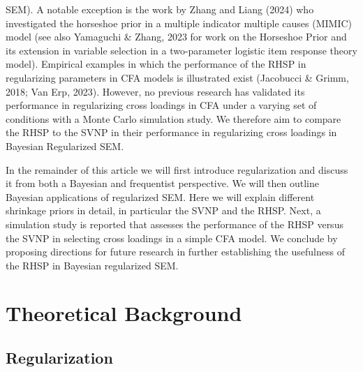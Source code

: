 \documentclass[
  man, donotrepeattitle,floatsintext]{apa6}
\begin{document}
SEM). A notable exception is the work by Zhang and Liang (2024) who
investigated the horseshoe prior in a multiple indicator multiple causes
(MIMIC) model (see also Yamaguchi \& Zhang, 2023 for work on the Horseshoe
Prior and its extension in variable selection in a two-parameter
logistic item response theory model). Empirical examples in which the
performance of the RHSP in regularizing parameters in CFA models is
illustrated exist (Jacobucci \& Grimm, 2018; Van Erp, 2023). However,
no previous research has validated its performance in regularizing cross
loadings in CFA under a varying set of conditions with a Monte Carlo
simulation study. We therefore aim to compare the RHSP to the SVNP in
their performance in regularizing cross loadings in Bayesian Regularized
SEM.

In the remainder of this article we will first introduce regularization and
discuss it from both a Bayesian and frequentist perspective. We will
then outline Bayesian applications of regularized SEM. Here we will
explain different shrinkage priors in detail, in particular the SVNP and
the RHSP. Next, a simulation study is reported that assesses the
performance of the RHSP versus the SVNP in selecting cross loadings in a
simple CFA model. We conclude by proposing directions for future
research in further establishing the usefulness of the RHSP in Bayesian
regularized SEM.

\section{Theoretical Background}\label{theoretical-background}

\subsection{Regularization}\label{regularization}
\end{document}
